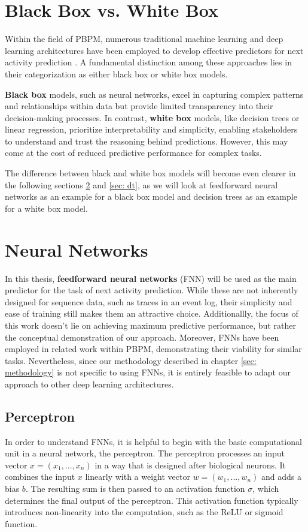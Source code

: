 \section{Black Box vs. White Box}
Within the field of PBPM, numerous traditional machine learning
and deep learning architectures have been employed
to develop effective predictors for next activity prediction \cite{ml_pbpm}.
A fundamental distinction among these approaches
lies in their categorization as either black box or white box models.

\textbf{Black box} models, such as neural networks,
excel in capturing complex patterns and relationships within data
but provide limited transparency into their decision-making processes.
In contrast, \textbf{white box} models, like decision trees or linear regression,
prioritize interpretability and simplicity,
enabling stakeholders to understand and trust the reasoning behind predictions.
However, this may come at the cost of reduced predictive performance for complex tasks.
\cite{black_white}

The difference between black and white box models will become even clearer
in the following sections \ref{sec: nn} and \ref{sec: dt},
as we will look at feedforward neural networks as an example for a black box model
and decision trees as an example for a white box model.

\section{Neural Networks}
\label{sec: nn}
In this thesis, \textbf{feedforward neural networks} (FNN)
will be used as the main predictor for the task of next activity prediction.
While these are not inherently designed for sequence data,
such as traces in an event log, their simplicity and ease of training still makes them an attractive choice.
Additionallly, the focus of this work doesn't lie on achieving maximum predictive performance,
but rather the conceptual demonstration of our approach.
Moreover, FNNs have been employed in related work \cite{fairness_adversarial} within PBPM,
demonstrating their viability for similar tasks.
Nevertheless, since our methodology described in chapter \ref{sec: methodology}
is not specific to using FNNs,
it is entirely feasible to adapt our approach to other deep learning architectures.

\subsection{Perceptron}
\label{sec: perceptron}
In order to understand FNNs,
it is helpful to begin with the basic computational unit in a neural network,
the perceptron.
The perceptron processes an input vector $x = (x_1, ..., x_n)$
in a way that is designed after biological neurons.
It combines the input $x$ linearly with a weight vector $w = (w_1, ..., w_n)$
and adds a bias $b$.
The resulting sum is then passed to an activation function $\sigma$,
which determines the final output of the perceptron.
This activation function typically introduces non-linearity into the computation,
such as the ReLU or sigmoid function. \cite{perceptron}

